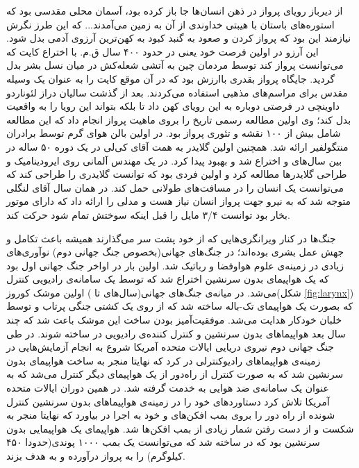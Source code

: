 از دیرباز رویای پرواز در ذهن انسان‌ها جا باز کرده بود، آسمان محلی مقدسی بود که استوره‌های باستان با هیبتی خداوندی از آن به زمین می‌آمدند... که این طرز نگرش نیازمند این بود که پرواز کردن و صعود به گنبد کبود به کهن‌ترین آرزوی آدمی بدل شود. این آرزو در اولین فرصت خود یعنی در حدود ۴۰۰ سال ق.م. با اختراع کایت که می‌توانست پرواز کند توسط مردمان چین به آتشی شعله‌کش در میان نسل بشر بدل گردید. جایگاه پرواز بقدری باارزش بود که در آن موقع کایت را به عنوان یک وسیله مقدس برای مراسم‌های مذهبی استفاده می‌کردند. بعد از گذشت سالیان دراز لئوناردو داوینچی در  فرصتی دوباره به این رویای کهن داد تا بلکه بتواند این رویا را به واقعیت بدل کند؛ وی اولین مطالعه رسمی تاریخ را بروی ماهیت پرواز انجام داد که این مطالعه شامل بیش از ۱۰۰ نقشه و تئوری پرواز بود. در  اولین بالن هوای گرم توسط برادران منتگولفیر ارائه شد. همچنین اولین گلایدر به همت آقای کی‌لی در یک دوره ۵۰ ساله در بین سال‌های  و  اختراع شد و بهبود پیدا کرد. در  یک مهندس آلمانی روی ایرودینامیک و طراحی گلایدرها مطالعه کرد و اولین فردی بود که توانست گلایدری را طراحی کند که می‌توانست یک انسان را در مسافت‌های طولانی حمل کند. در همان سال آقای لنگلی متوجه شد که به نیرو جهت پرواز انسان نیاز هست و مدلی را ارائه داد که دارای موتور بخار بود توانست ۳/۴ مایل را قبل اینکه سوختش تمام شود حرکت کند.

جنگ‌ها در کنار ویرانگری‌هایی که از خود پشت سر می‌گذارند همیشه باعث تکامل و جهش عمل بشری بوده‌اند؛ در جنگ‌های جهانی(بخصوص جنگ جهانی دوم) نوآوری‌های زیادی در زمینه‌ی علوم هواوفضا و رباتیک شد. اولین بار در اواخر جنگ جهانی اول بود که یک هواپیمای بدون سرنشین اختراع شد که توسط یک سامانه‌ی رادیویی کنترل می‌شد. در میانه‌ی جنگ‌های جهانی(سال‌های  تا ) اولین موشک کوروز(شکل \ref{fig:larynx}) که بصورت یک هواپیمای تک-باله ساخته شد که از روی یک کشتی جنگی پرتاب و توسط خلبان خودکار هدایت می‌شد. موفقیت‌آمیز بودن ساخت این موشک باعث شد که چند سال بعد هواپیماهای بدون سرنشین و کنترل کننده‌ی رادیویی در  ساخته شوند. در طی جنگ جهانی دوم نیروی دریایی ایالات متحده آمریکا شروع به انجام آزمایش‌هایی در زمینه‌ی هواپیما‌های رادیوکنترلی در  کرد که نهایتا منجر به ساخت هواپیمای بدون سرنشین  شد که به صورت کنترل از راه‌دور از یک هواپیمای دیگر کنترل می‌شد که به عنوان یک سامانه‌ی ضد هوایی به خدمت گرفته شد. در همین دوران ایالات متحده آمریکا تلاش کرد دستاوردهای خود را در زمینه‌ی هواپیماهای بدون سرنشین کنترل شونده از راه دور را بروی بمب افکن‌های  و  خود به اجرا در بیاورد که نهایتا منجر به شکست و از دست رفتن شمار زیادی از بمب افکن‌ها شد. هواپیمای  یک هواپیمایی بدون سرنشین بود که در  ساخته شد که می‌توانست یک بمب ۱۰۰۰ پوندی(حدودا ۴۵۰ کیلوگرم) را به پرواز درآورده و به هدف بزند.


